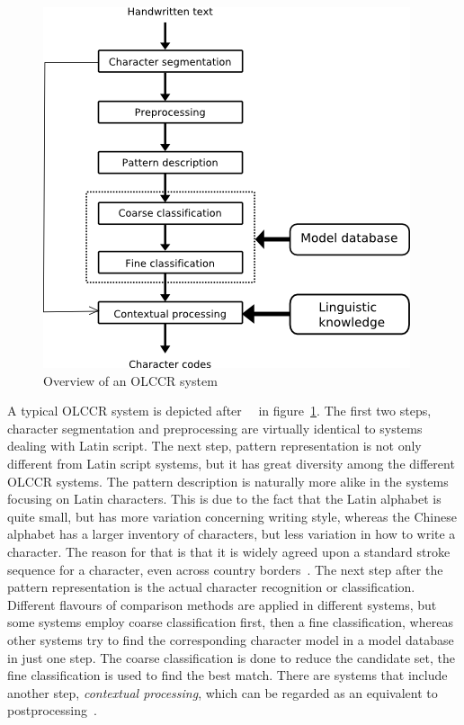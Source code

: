 \begin{figure}[htbp]
  \begin{center}
\includegraphics[scale=0.5]{images/olccrSystemOverview.png}
\caption{Overview of an OLCCR system}
\label{fig:olccrsystemoverview}
  \end{center}
\end{figure}

A typical OLCCR system is depicted 
after~~\citeyear{LiuJaegerNakagawa2004} in 
figure~\ref{fig:olccrsystemoverview}.
The first two steps, character segmentation and preprocessing are virtually
identical to systems dealing with Latin script. The next step, pattern 
representation is not only different from Latin script systems, but it has
great diversity among the different OLCCR systems.
The pattern description is naturally more alike in the systems focusing on 
Latin characters. This is due to the fact that the Latin alphabet is quite 
small, but has more variation concerning writing style, whereas the Chinese 
alphabet has a larger inventory of characters, but less variation in how to 
write a character. The reason for that is that it is widely agreed upon a 
standard stroke sequence for a character, even across country 
borders~.
The next step after the pattern representation is the actual character 
recognition or classification. Different flavours of comparison methods are
applied in different systems, but some systems employ coarse classification 
first, then a fine classification, whereas other systems try to find the 
corresponding character model in a model database in just one step.
The coarse classification is done to reduce the candidate set, the fine 
classification is used to find the best match. There are systems that 
include another step, \emph{contextual processing}, which can be regarded 
as an equivalent to postprocessing~.

